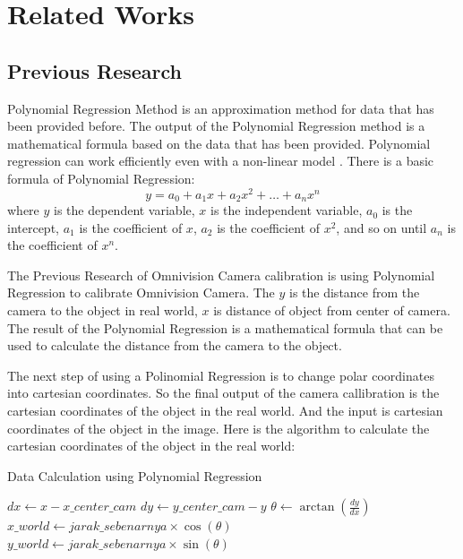 \section{Related Works}
\label{sec:tinjauanpustaka}

\subsection{Previous Research}
Polynomial Regression Method is an approximation method for data that has been provided before. The output of the Polynomial Regression method is a mathematical formula based on the data that has been provided. Polynomial regression can work efficiently even with a non-linear model
\citet{ref_regresi}. There is a basic formula of Polynomial Regression: 
\begin{equation}
  y = a_0 + a_1x + a_2x^2 + \ldots + a_nx^n
\end{equation} 
where $y$ is the dependent variable, $x$ is the independent variable, $a_0$ is the intercept, $a_1$ is the coefficient of $x$, $a_2$ is the coefficient of $x^2$, and so on until $a_n$ is the coefficient of $x^n$. 

The Previous Research of Omnivision Camera calibration is using Polynomial Regression to calibrate Omnivision Camera. The $y$ is the distance from the camera to the object in real world, $x$ is distance of object from center of camera. The result of the Polynomial Regression is a mathematical formula that can be used to calculate the distance from the camera to the object.

The next step of using a Polinomial Regression is to change polar coordinates into cartesian coordinates. So the final output of the camera callibration is the cartesian coordinates of the object in the real world. And the input is cartesian coordinates of the object in the image. Here is the algorithm to calculate the cartesian coordinates of the object in the real world: 
\begin{algorithm}
  \caption{Data Calculation using Polynomial Regression}\label{alg:calculate_coordinates}
  \begin{algorithmic}[1]
      \State {} $dx \gets x - x\_center\_cam$
      \State {} $dy \gets y\_center\_cam - y$
      \State {} $\theta \gets \arctan(\frac{dy}{dx})$
      \State {} $x\_world \gets jarak\_sebenarnya \times \cos(\theta)$
      \State {} $y\_world \gets jarak\_sebenarnya \times \sin(\theta)$
  \EndProcedure
  \end{algorithmic}
\end{algorithm}

